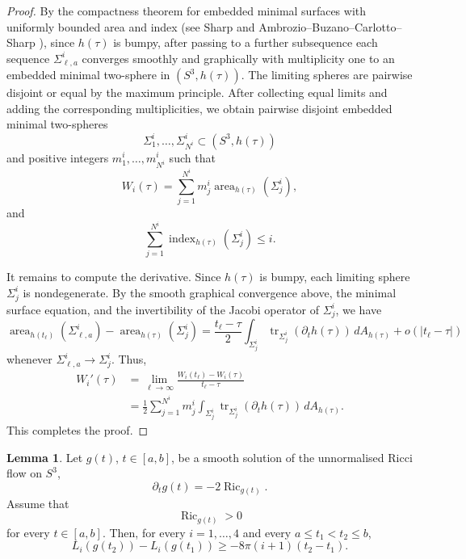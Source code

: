\documentclass[12pt,english]{amsart}
\theoremstyle{definition}
\newtheorem{lemma}[theorem]{Lemma}
\begin{document}
\begin{proof}
By the compactness theorem for embedded minimal surfaces with uniformly bounded area and index (see Sharp \cite{Sh} and Ambrozio--Buzano--Carlotto--Sharp \cite{ABCS}), since \(h(\tau)\) is bumpy, after passing to a further subsequence each sequence \(\Sigma^i_{\ell,a}\) converges smoothly and graphically with multiplicity one to an embedded minimal two-sphere in \((S^3,h(\tau))\). The limiting spheres are pairwise disjoint or equal by the maximum principle. After collecting equal limits and adding the corresponding multiplicities, we obtain pairwise disjoint embedded minimal two-spheres
\[
\Sigma^i_{1},\ldots,\Sigma^i_{N^i}
\subset (S^3,h(\tau))
\]
and positive integers \(m^i_{1},\ldots,m^i_{N^i}\) such that
\[
W_i(\tau)
=
\sum_{j=1}^{N^i}
m^i_{j}\operatorname{area}_{h(\tau)}(\Sigma^i_{j}),
\]
and
\[
\sum_{j=1}^{N^i}
\operatorname{index}_{h(\tau)}(\Sigma^i_{j})
\le i.
\]

It remains to compute the derivative. Since \(h(\tau)\) is bumpy, each limiting
sphere \(\Sigma^i_j\) is nondegenerate. By the smooth graphical convergence above, the minimal surface equation, and the invertibility of the Jacobi operator of \(\Sigma^i_j\), we have
\[
\operatorname{area}_{h(t_\ell)}(\Sigma^i_{\ell,a})
-
\operatorname{area}_{h(\tau)}(\Sigma^i_j)
=
\frac{t_\ell-\tau}{2}
\int_{\Sigma^i_j}
\operatorname{tr}_{\Sigma^i_j}(\partial_t h(\tau))\,dA_{h(\tau)}
+
o(|t_\ell-\tau|)
\]
whenever $\Sigma^i_{\ell,a} \to \Sigma^i_j$. Thus,
\[
\begin{aligned}
W_i'(\tau)
&=
\lim_{\ell\to\infty}
\frac{W_i(t_\ell)-W_i(\tau)}{t_\ell-\tau} \\
&=
\frac12
\sum_{j=1}^{N^i}
m^i_j
\int_{\Sigma^i_j}
\operatorname{tr}_{\Sigma^i_j}(\partial_t h(\tau))\,dA_{h(\tau)}.
\end{aligned}
\]
This completes the proof.
\end{proof}

\begin{lemma}
\label{lem:integrated-ricci-derivative}
Let \(g(t)\), \(t\in[a,b]\), be a smooth solution of the unnormalised Ricci flow on \(S^3\),
\[
\partial_t g(t)=-2\operatorname{Ric}_{g(t)}.
\]
Assume that
\[
\operatorname{Ric}_{g(t)}>0
\]
for every \(t\in[a,b]\). Then, for every \(i=1,\ldots,4\) and every \(a\le t_1<t_2\le b\),
\[
L_i(g(t_2))-L_i(g(t_1))
\ge
-8\pi(i+1)(t_2-t_1).
\]
\end{lemma}
\end{document}
